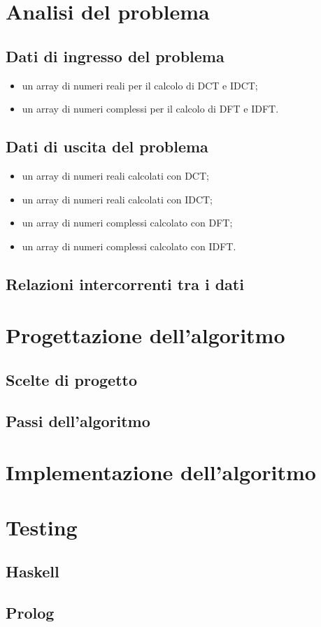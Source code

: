 \documentclass{report}
\begin{document}
	\chapter{Analisi del problema}

	
	\section{Dati di ingresso del problema}
	
	\begin{itemize}
		\item un array di numeri reali per il calcolo di DCT e IDCT;
		\item un array di numeri complessi per il calcolo di DFT e IDFT.
	\end{itemize}
	\section{Dati di uscita del problema}
	\begin{itemize}
		\item un array di numeri reali calcolati con DCT;
		\item un array di numeri reali calcolati con IDCT;
		\item un array di numeri complessi calcolato con DFT;
		\item un array di numeri complessi calcolato con IDFT.
	\end{itemize}
	\section{Relazioni intercorrenti tra i dati}

	
	\chapter{Progettazione dell'algoritmo}
	\section{Scelte di progetto}

	\section{Passi dell'algoritmo}
	
	\chapter{Implementazione dell'algoritmo}

    \chapter{Testing}
    \section{Haskell}
    \section{Prolog}
	
\end{document}
